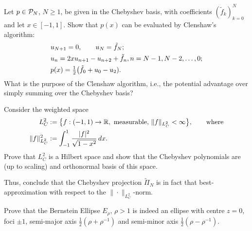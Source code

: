 \begin{exercise}
   \label{exr:poly:clenshaw}
   Let $p \in \mathcal{P}_N$, $N \geq 1$, be given in the Chebyshev basis, with
   coefficients $(\tilde{f}_k)_{k = 0}^N$ and let $x \in [-1,1]$. Show that
   $p(x)$ can be evaluated by Clenshaw's algorithm:
   \begin{align*}
      & u_{N+1} = 0, \qquad u_N = \tilde{f}_N; \\ 
      & u_n = 2 x u_{n+1} - u_{n+2} + \tilde{f}_n, n = N-1, N-2, \dots, 0; \\ 
      & p(x) = {\textstyle \frac{1}{2}} \big( \tilde{f}_0 + u_0 - u_2).   
   \end{align*}
   What is the purpose of the Clenshaw algorithm, i.e., the potential 
   advantage over simply summing over the Chebyshev basis?
\end{exercise}

\begin{exercise}[Orthogonality of $T_k$]
   Consider the weighted space 
   \begin{align*}
      L^2_C &:= \big\{ f : (-1,1) \to \mathbb{R}, \text{ measurable, } 
            \|f\|_{L^2_C} < \infty \big\}, \qquad 
            \text{where} \\  
      \|f\|_{L^2_C}^2 &:= \int_{-1}^1 \frac{|f|^2}{\sqrt{1 - x^2}} \,dx.
   \end{align*}
   Prove that $L^2_C$ is a Hilbert space and show that the Chebyshev 
   polynomials are (up to scaling) and orthonormal basis of this space. 

   Thus, conclude that the Chebyshev projection $\tilde\Pi_N$ is in fact that 
   best-approximation with respect to the $\|\cdot\|_{L^2_C}$-norm. 
\end{exercise}

\begin{exercise} 
   \label{exr:poly:ellipse}
   Prove that the Bernstein Ellipse $E_\rho$, $\rho > 1$ is indeed an ellipse
   with centre $z = 0$, foci $\pm 1$, semi-major axis $\frac12 (\rho+\rho^{-1})$
   and semi-minor axis $\frac12 (\rho-\rho^{-1})$.
\end{exercise}



